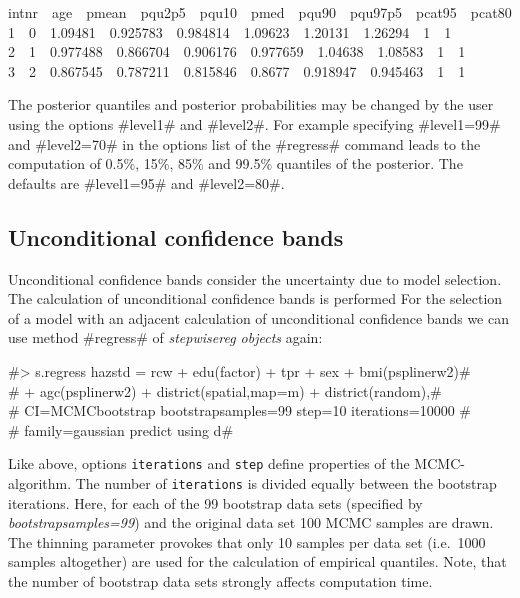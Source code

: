 \documentclass[11pt,a4paper,twoside]{bayesxreport}
\begin{document}
{\footnotesize
 intnr \,\, age \,\, pmean \,\, pqu2p5 \,\, pqu10 \,\, pmed \,\, pqu90 \,\, pqu97p5 \,\, pcat95 \,\, pcat80\\
1 \,\,  0 \,\,  1.09481 \,\,  0.925783 \,\,  0.984814  \,\, 1.09623  \,\, 1.20131  \,\, 1.26294 \,\,  1 \,\,  1 \\
2 \,\,  1 \,\,  0.977488 \,\,  0.866704 \,\,  0.906176 \,\,  0.977659  \,\, 1.04638  \,\, 1.08583 \,\,  1 \,\,  1 \\
3 \,\,  2 \,\,  0.867545 \,\,  0.787211 \,\,  0.815846 \,\,  0.8677
\,\,  0.918947 \,\,  0.945463 \,\,  1 \,\,  1}

The posterior quantiles and posterior probabilities may be changed
by the user using the options #level1# and #level2#. For example
specifying #level1=99# and #level2=70# in the options list of the
#regress# command leads to the computation of 0.5\%, 15\%, 85\% and
99.5\% quantiles of the posterior. The defaults are #level1=95# and
#level2=80#.


\subsection{Unconditional confidence bands}\label{zambia_step_uncond}

Unconditional confidence bands consider the uncertainty due to model
selection. The calculation of unconditional confidence bands is
performed For the selection of a model with an adjacent calculation
of unconditional confidence bands we can use method #regress# of
{\em stepwisereg objects} again:

 #> s.regress hazstd = rcw + edu(factor) + tpr + sex + bmi(psplinerw2)#\\
 #  + agc(psplinerw2) + district(spatial,map=m) + district(random),#\\
 #  CI=MCMCbootstrap bootstrapsamples=99 step=10 iterations=10000 #\\
 #  family=gaussian predict using d#

Like above, options {\tt iterations} and {\tt step} define
properties of the MCMC-algorithm. The number of {\tt iterations} is
divided equally between the bootstrap iterations. Here, for each of
the 99 bootstrap data sets (specified by {\it bootstrapsamples=99})
and the original data set 100 MCMC samples are drawn. The thinning
parameter provokes that only 10 samples per data set (i.e.~1000
samples altogether) are used for the calculation of empirical
quantiles. Note, that the number of bootstrap data sets strongly
affects computation time.
\end{document}
